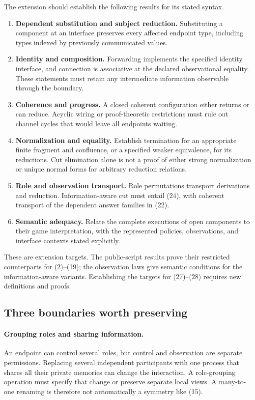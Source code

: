 The extension should establish the following results for its stated syntax.
\begin{enumerate}
\item \textbf{Dependent substitution and subject reduction.} Substituting a
      component at an interface preserves every affected endpoint type,
      including types indexed by previously communicated values.
\item \textbf{Identity and composition.} Forwarding implements the specified
      identity interface, and connection is associative at the declared
      observational equality. These statements must retain any intermediate
      information observable through the boundary.
\item \textbf{Coherence and progress.} A closed coherent configuration either
      returns or can reduce. Acyclic wiring or proof-theoretic restrictions
      must rule out channel cycles that would leave all endpoints waiting.
\item \textbf{Normalization and equality.} Establish termination for an
      appropriate finite fragment and confluence, or a specified weaker
      equivalence, for its reductions. Cut elimination alone is not a proof
      of either strong normalization or unique normal forms for arbitrary
      reduction relations.
\item \textbf{Role and observation transport.} Role permutations transport
      derivations and reduction. Information-aware cut must entail (24),
      with coherent transport of the dependent answer families in (22).
\item \textbf{Semantic adequacy.} Relate the complete executions of open
      components to their game interpretation, with the represented policies,
      observations, and interface contexts stated explicitly.
\end{enumerate}

These are extension targets. The public-script results prove their restricted
counterparts for (2)--(19); the observation laws give semantic conditions for
the information-aware variants. Establishing the targets for (27)--(28)
requires new definitions and proofs.

\subsection{Three boundaries worth preserving}

\paragraph{Grouping roles and sharing information.}
An endpoint can control several roles, but control and observation are separate
permissions. Replacing several independent participants with one process that
shares all their private memories can change the interaction. A role-grouping
operation must specify that change or preserve separate local views. A
many-to-one renaming is therefore not automatically a symmetry like (15).

